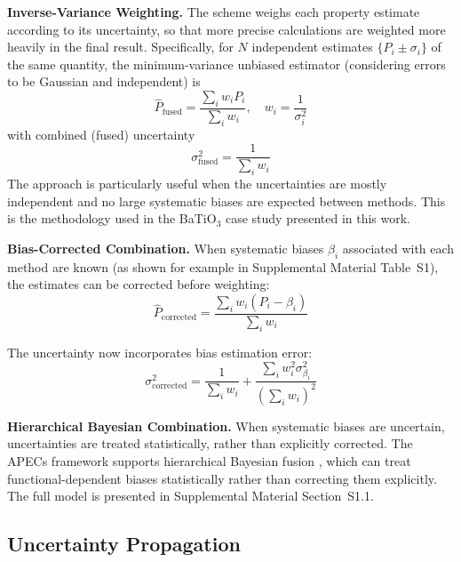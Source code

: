 \documentclass[prb,twocolumn,superscriptaddress,amsmath,amssymb,longbibliography]{revtex4-2}
\begin{document}
{\bf Inverse-Variance Weighting.}
 The scheme weighs each property estimate according to its uncertainty, so that more precise calculations are weighted more heavily in the final result. Specifically, for $N$ independent estimates $\{P_i \pm \sigma_i\}$ of the same quantity, the 
minimum-variance unbiased estimator (considering errors to be Gaussian and 
independent) is \cite{Sivia2006}
\begin{equation}
    \hat{P}_{\mathrm{fused}} = \frac{\sum_i w_i P_i}{\sum_i w_i}, \quad
    w_i = \frac{1}{\sigma_i^2}
    \label{eq:ivw}
\end{equation}
with combined (fused) uncertainty
\begin{equation}
    \sigma_{\mathrm{fused}}^2 = \frac{1}{\sum_i w_i}
    \label{eq:ivw_uncertainty}
\end{equation}
The approach is particularly useful when the uncertainties are mostly independent and no large systematic biases are expected between methods. This is the methodology used in the BaTiO$_3$ 
case study presented in this work. 

{\bf Bias-Corrected Combination.}
When systematic biases $\beta_i$ associated with each method are known (as shown for example in Supplemental Material Table~S1), 
the estimates can be corrected before weighting:
\begin{equation}
    \hat{P}_{\mathrm{corrected}} = \frac{\sum_i w_i (P_i - \beta_i)}{\sum_i w_i}
    \label{eq:bias_corrected}
\end{equation}

The uncertainty now incorporates bias estimation error:
\begin{equation}
    \sigma_{\mathrm{corrected}}^2 = \frac{1}{\sum_i w_i} + 
    \frac{\sum_i w_i^2 \sigma_{\beta_i}^2}{(\sum_i w_i)^2}
    \label{eq:bias_corrected_uncertainty}
\end{equation}

{\bf Hierarchical Bayesian Combination.}
When systematic biases are uncertain, uncertainties are treated statistically, rather than explicitly corrected. The APECs framework supports 
hierarchical Bayesian fusion \cite{Kennedy2001,Sivia2006}, which can treat functional-dependent biases statistically rather than correcting them explicitly.
The full model 
is presented in Supplemental Material Section~S1.1. 

\subsection{Uncertainty Propagation}
\label{sec:propagation}
\end{document}
